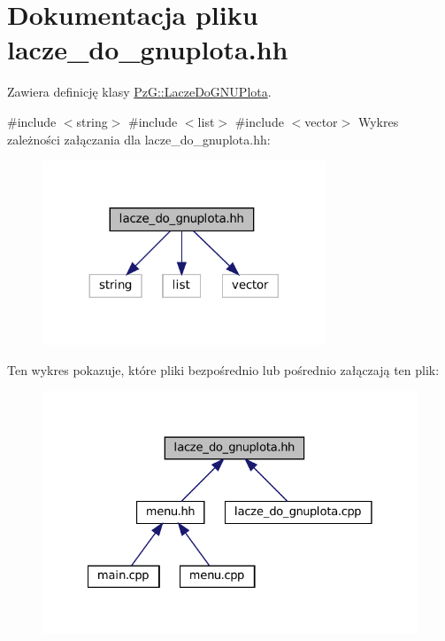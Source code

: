 \hypertarget{lacze__do__gnuplota_8hh}{}\section{Dokumentacja pliku lacze\+\_\+do\+\_\+gnuplota.\+hh}
\label{lacze__do__gnuplota_8hh}


Zawiera definicję klasy \mbox{\hyperlink{class_pz_g_1_1_lacze_do_g_n_u_plota}{Pz\+G\+::\+Lacze\+Do\+G\+N\+U\+Plota}}.  


{\ttfamily \#include $<$string$>$}\newline
{\ttfamily \#include $<$list$>$}\newline
{\ttfamily \#include $<$vector$>$}\newline
Wykres zależności załączania dla lacze\+\_\+do\+\_\+gnuplota.\+hh\+:\nopagebreak
\begin{figure}[H]
\begin{center}
\leavevmode
\includegraphics[width=240pt]{lacze__do__gnuplota_8hh__incl}
\end{center}
\end{figure}
Ten wykres pokazuje, które pliki bezpośrednio lub pośrednio załączają ten plik\+:
\nopagebreak
\begin{figure}[H]
\begin{center}
\leavevmode
\includegraphics[width=328pt]{lacze__do__gnuplota_8hh__dep__incl}
\end{center}
\end{figure}
